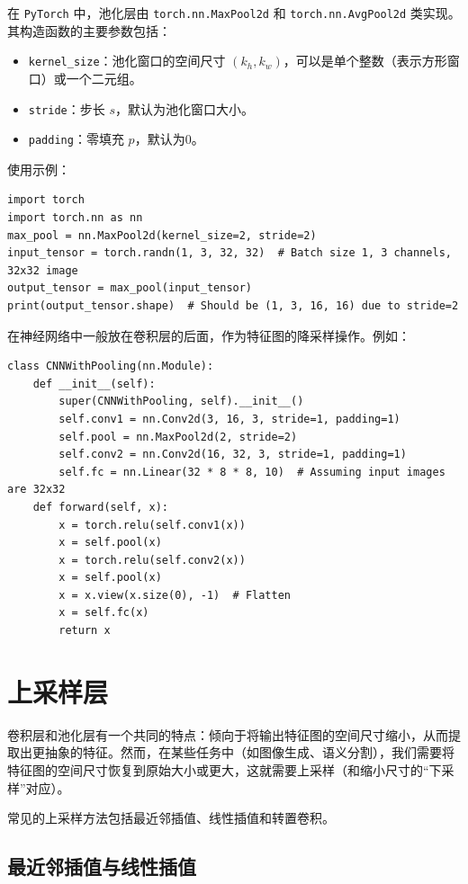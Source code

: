 在 \texttt{PyTorch} 中，池化层由 \texttt{torch.nn.MaxPool2d} 和 \texttt{torch.nn.AvgPool2d} 类实现。其构造函数的主要参数包括：

\begin{itemize}
    \item \texttt{kernel_size}：池化窗口的空间尺寸 $(k_h, k_w)$，可以是单个整数（表示方形窗口）或一个二元组。
    \item \texttt{stride}：步长 $s$，默认为池化窗口大小。
    \item \texttt{padding}：零填充 $p$，默认为0。
\end{itemize}
使用示例：
\begin{verbatim}
import torch
import torch.nn as nn
max_pool = nn.MaxPool2d(kernel_size=2, stride=2)
input_tensor = torch.randn(1, 3, 32, 32)  # Batch size 1, 3 channels, 32x32 image
output_tensor = max_pool(input_tensor)
print(output_tensor.shape)  # Should be (1, 3, 16, 16) due to stride=2
\end{verbatim}

在神经网络中一般放在卷积层的后面，作为特征图的降采样操作。例如：
\begin{verbatim}
class CNNWithPooling(nn.Module):
    def __init__(self):
        super(CNNWithPooling, self).__init__()
        self.conv1 = nn.Conv2d(3, 16, 3, stride=1, padding=1)
        self.pool = nn.MaxPool2d(2, stride=2)
        self.conv2 = nn.Conv2d(16, 32, 3, stride=1, padding=1)
        self.fc = nn.Linear(32 * 8 * 8, 10)  # Assuming input images are 32x32
    def forward(self, x):
        x = torch.relu(self.conv1(x))
        x = self.pool(x)
        x = torch.relu(self.conv2(x))
        x = self.pool(x)
        x = x.view(x.size(0), -1)  # Flatten
        x = self.fc(x)
        return x
\end{verbatim}

\section{上采样层}

卷积层和池化层有一个共同的特点：倾向于将输出特征图的空间尺寸缩小，从而提取出更抽象的特征。然而，在某些任务中（如图像生成、语义分割），我们需要将特征图的空间尺寸恢复到原始大小或更大，这就需要上采样（和缩小尺寸的“下采样”对应）。

常见的上采样方法包括最近邻插值、线性插值和转置卷积。

\subsection{最近邻插值与线性插值}


